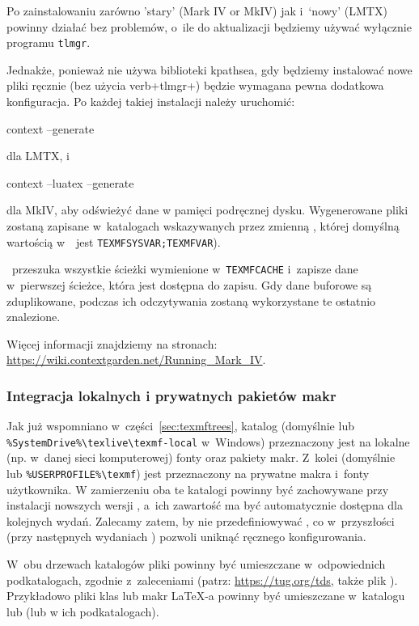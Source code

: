 \documentclass{article}
\begin{document}
Po zainstalowaniu \TL zarówno 'stary' \ConTeXt{} (Mark IV or MkIV) jak i~`nowy' \ConTeXt{} (LMTX) powinny działać  bez problemów, o~ile do aktualizacji będziemy
używać wyłącznie programu \verb+tlmgr+.

Jednakże, ponieważ \ConTeXt{} nie używa biblioteki kpathsea, gdy będziemy instalować nowe pliki ręcznie (bez użycia verb+tlmgr+) 
będzie wymagana pewna dodatkowa konfiguracja.  Po każdej takiej 
instalacji należy uruchomić:
\begin{sverbatim}
context --generate
\end{sverbatim}
dla LMTX, i
\begin{sverbatim}
context --luatex --generate
\end{sverbatim}
dla MkIV, aby odświeżyć  dane w pamięci podręcznej dysku.
Wygenerowane pliki zostaną zapisane w~katalogach wskazywanych przez
zmienną  , której domyślną wartością  w~\TL\ jest
\verb+TEXMFSYSVAR;TEXMFVAR+).

\ConTeXt\ przeszuka wszystkie ścieżki wymienione w~\verb+TEXMFCACHE+
i~zapisze dane w~pierwszej ścieżce, która jest dostępna
do zapisu. Gdy dane buforowe są zduplikowane, podczas ich odczytywania
zostaną wykorzystane te ostatnio znalezione.

Więcej informacji znajdziemy na stronach:
\url{https://wiki.contextgarden.net/Running_Mark_IV}.

\subsubsection{Integracja lokalnych i prywatnych pakietów makr}
\label{sec:local-personal-macros}

Jak już wspomniano w~części~\ref{sec:texmftrees}, katalog 
(domyślnie  lub
\verb|%SystemDrive%\texlive\texmf-local| w~Windows) 
przeznaczony jest na lokalne
(np. w~danej sieci komputerowej) fonty oraz pakiety makr. Z~kolei
 (domyślnie  lub
\verb|%USERPROFILE%\texmf|) jest przeznaczony na prywatne makra i~fonty
użytkownika. W zamierzeniu oba te katalogi powinny być zachowywane przy
instalacji nowszych wersji \TL{}, a~ich zawartość ma być automatycznie
dostępna dla kolejnych wydań. Zalecamy zatem, by nie
przedefiniowywać , co w~przyszłości (przy następnych wydaniach \TL) pozwoli uniknąć ręcznego konfigurowania.

W~obu drzewach katalogów pliki powinny być umieszczane w~odpowiednich
podkatalogach, zgodnie z~zaleceniami \TDS{} (patrz: \url{https://tug.org/tds},
także  plik ). Przykładowo pliki klas lub
makr \LaTeX-a powinny być umieszczane w~katalogu
 lub 
(lub w ich podkatalogach).
\end{document}
